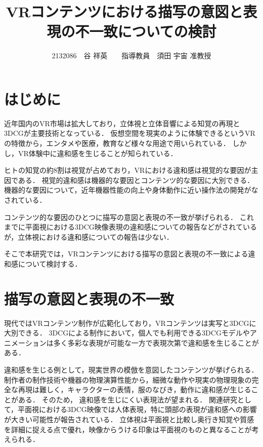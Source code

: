 \documentclass[twocolumn,10pt,a4j]{ltjsarticle}
\title{VRコンテンツにおける描写の意図と表現の不一致についての検討}
\author{2132086　谷 祥英　　指導教員　須田 宇宙 准教授}
\date{}
\begin{document}
\maketitle

\section{はじめに}

近年国内のVR市場は拡大しており，立体視と立体音響による知覚の再現と3DCGが主要技術となっている．
仮想空間を現実のように体験できるというVRの特徴から，エンタメや医療，教育など様々な用途で用いられている．
しかし，VR体験中に違和感を生じることが知られている．

ヒトの知覚の約8割は視覚が占めており，VRにおける違和感は視覚的な要因が主因である．
視覚的違和感は機器的な要因とコンテンツ的な要因に大別できる．
機器的な要因について，近年機器性能の向上や身体動作に近い操作法の開発がなされている．

コンテンツ的な要因のひとつに描写の意図と表現の不一致が挙げられる．
これまでに平面視における3DCG映像表現の違和感についての報告などがされているが，立体視における違和感についての報告は少ない．


そこで本研究では，VRコンテンツにおける描写の意図と表現の不一致による違和感について検討する．

\section{描写の意図と表現の不一致}
現代ではVRコンテンツ制作が広範化しており，VRコンテンツは実写と3DCGに大別できる．
3DCGによる制作において，個人でも利用できる3DCGモデルやアニメーションは多く多彩な表現が可能な一方で表現次第で違和感を生じることがある．

違和感を生じる例として，現実世界の模倣を意図したコンテンツが挙げられる．
制作者の制作技術や機器の物理演算性能から，細微な動作や現実の物理現象の完全な再現は難しく，キャラクターの表情，服のなびき，動作に違和感が生じることがある．
そのため，%
違和感を生じにくい表現法が望まれる．
関連研究として，平面視における3DCG映像では人体表現，特に頭部の表現が違和感への影響が大きい可能性が報告されている\cite{previous1}．
立体視は平面視と比較し奥行き知覚や質感を詳細に捉える点で優れ，映像からうける印象は平面視のものと異なることが考えられる．
\end{document}
